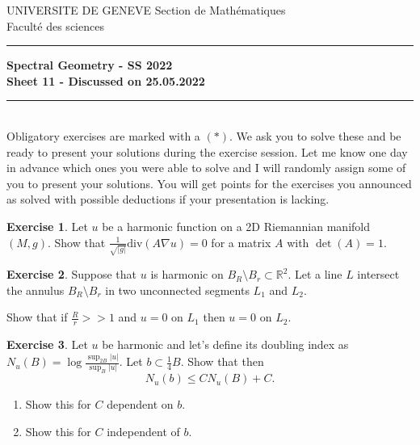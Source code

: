 \documentclass[a4paper,11pt]{article}
\theoremstyle{definition}
\newtheorem{exercise}{Exercise}
\begin{document}
\pagestyle{headings}
\noindent UNIVERSITE DE GENEVE \hfill Section de Mathématiques\\
\noindent Facult\'e des sciences \hfill \\[-3mm]
\hrule

\large

\begin{center}
\textbf{Spectral Geometry - SS 2022 \\ Sheet 11 - Discussed on 25.05.2022}
\end{center}
\hrule
\text{}\\[1cm]

Obligatory exercises are marked with a $(*)$. We ask you to solve these and be ready to present your solutions during the exercise session. Let me know one day in advance which ones you were able to solve and I will randomly assign some of you to present your solutions. You will get points for the exercises you announced as solved with possible deductions if your presentation is lacking.

\begin{exercise}
	Let $u$ be a harmonic function on a 2D Riemannian manifold $(M,g)$. Show that $\frac{1}{\sqrt{|g|}} \text{div}(A \nabla u) = 0$ for a matrix $A$ with $\det(A) = 1$. 
\end{exercise}

\begin{exercise}
	Suppose that $u$ is harmonic on $B_R \setminus B_r \subset \mathbb{R}^2$. Let a line $L$ intersect the annulus $B_R \setminus B_r$ in two unconnected segments $L_1$ and $L_2$.

	Show that if $\frac{R}{r} >> 1$ and $u = 0$ on $L_1$ then $u = 0$ on $L_2$.
\end{exercise}

\begin{exercise}
	Let $u$ be harmonic and let's define its doubling index as $N_u(B) = \log \frac{\sup_{2B} |u|}{\sup_B |u|}$. Let $b \subset \frac{1}{4} B$. Show that then 
	\[ N_u(b) \leq C N_u(B) + C. \]
	\begin{enumerate}
		\item Show this for $C$ dependent on $b$.
		\item Show this for $C$ independent of $b$.  
	\end{enumerate}
\end{exercise}
\end{document}
